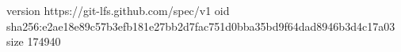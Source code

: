version https://git-lfs.github.com/spec/v1
oid sha256:e2ae18e89c57b3efb181e27bb2d7fac751d0bba35bd9f64dad8946b3d4c17a03
size 174940
